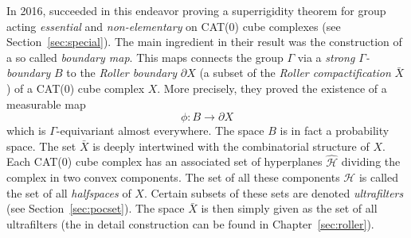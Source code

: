 In 2016, \textcite{MR3509968} succeeded in this endeavor proving a superrigidity theorem for group acting \emph{essential} and \emph{non-elementary} on CAT(0) cube complexes (see Section~\ref{sec:special}). The main ingredient in their result was the construction of a so called \emph{boundary map}. This maps connects the group \(\Gamma\) via a \emph{strong \(\Gamma\)-boundary} \(B\) to the \emph{Roller boundary} \(\partial X\) (a subset of the \emph{Roller compactification} \(\bar X\)) of a CAT(0) cube complex \(X\). More precisely, they proved the existence of a measurable map
\[
  \phi\colon B \to \partial X
\]
which is \(\Gamma\)-equivariant almost everywhere. The space \(B\) is in fact a probability space. The set \(\bar X\) is deeply intertwined with the combinatorial structure of \(X\). Each CAT(0) cube complex has an associated set of hyperplanes \(\mathcal{\hat H}\) dividing the complex in two convex components. The set of all these components \(\mathcal{H}\) is called the set of all \emph{halfspaces} of \(X\). Certain subsets of these sets are denoted \emph{ultrafilters} (see Section~\ref{sec:pocset}). The space \(\bar X\) is then simply given as the set of all ultrafilters (the in detail construction can be found in Chapter~\ref{sec:roller}).

